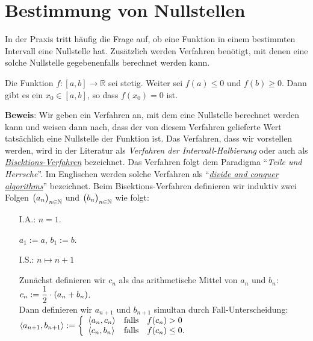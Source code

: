 \section{Bestimmung von Nullstellen}
In der Praxis tritt h\"aufig die Frage auf, ob eine Funktion in einem bestimmten Intervall
eine Nullstelle hat.  Zus\"atzlich werden Verfahren ben\"otigt, mit denen eine solche
Nullstelle gegebenenfalls berechnet werden kann.

\begin{Satz} \label{satz:zws-stetig}
Die Funktion $f:[a,b] \rightarrow \mathbb{R}$ sei stetig.  Weiter sei $f(a) \leq 0$ und
$f(b) \geq 0$.  Dann gibt es ein $x_0 \in [a,b]$, so dass $f(x_0) = 0$ ist.
\end{Satz}

\noindent
\textbf{Beweis}: Wir geben ein Verfahren an, mit dem eine Nullstelle berechnet werden kann
und weisen dann nach, dass der von diesem Verfahren gelieferte Wert tats\"achlich eine
Nullstelle der Funktion ist.  Das Verfahren, dass wir vorstellen werden, wird in der
Literatur als \emph{Verfahren der Intervall-Halbierung} oder auch als
\href{http://en.wikipedia.org/wiki/Bisection_method}{\emph{Bisektions-Verfahren}} bezeichnet.  
Das Verfahren folgt dem Paradigma ``\emph{Teile und Herrsche}''.  Im Englischen werden solche
Verfahren als
``\href{http://en.wikipedia.org/wiki/Divide_and_conquer_algorithms}{\emph{divide and conquer algorithms}}''
bezeichnet.
Beim Bisektions-Verfahren definieren wir induktiv zwei Folgen $\bigl(a_n\bigr)_{n\in\mathbb{N}}$ und
$\bigl(b_n\bigr)_{n\in\mathbb{N}}$ wie folgt:
\begin{enumerate}
\item[I.A.:] $n=1$.

      $a_1 := a$,  \quad $b_1 := b$.
\item[I.S.:] $n \mapsto n+1$

      Zun\"achst definieren wir $c_n$ als das arithmetische Mittel von $a_n$ und $b_n$:
      \\[0.2cm]
      \hspace*{1.3cm} $\displaystyle c_n := \frac{1}{2} \cdot (a_n + b_n)$. \\[0.2cm]
      Dann definieren wir $a_{n+1}$ und $b_{n+1}$ simultan durch Fall-Unterscheidung:
      \\[0.2cm]
      \hspace*{1.3cm}
      $\pair(a_{n+1}, b_{n+1}) := \left\{ \begin{array}{ll}
                          \pair(a_n,c_n) & \mbox{falls}\quad f(c_n) >    0 \\
                          \pair(c_n,b_n)   & \mbox{falls}\quad f(c_n) \leq 0. \\
                          \end{array}
                  \right.
      $
\end{enumerate}
